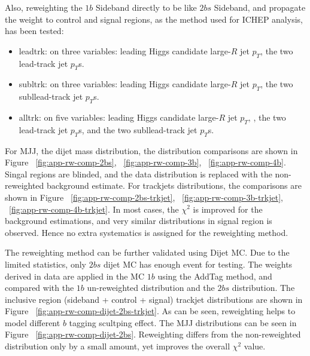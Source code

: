 Also, reweighting the $1b$ Sideband directly to be like $2bs$ Sideband, and propagate the weight to control and signal regions, as the method used for ICHEP analysis, has been tested:
\begin{itemize}
	\item leadtrk: on three variables: leading Higgs candidate large-$R$ jet $p_{T}$, the two lead-track jet $p_{T}$s.
	\item subltrk: on three variables: leading Higgs candidate large-$R$ jet $p_{T}$, the two subllead-track jet $p_{T}$s.
	\item alltrk: on five variables: leading Higgs candidate large-$R$ jet $p_{T}$, , the two lead-track jet $p_{T}$s, and the two subllead-track jet $p_{T}$s.
\end{itemize}

For MJJ, the dijet mass distribution, the distribution comparisons are shown in Figure ~\ref{fig:app-rw-comp-2bs}, ~\ref{fig:app-rw-comp-3b}, ~\ref{fig:app-rw-comp-4b}. Singal regions are blinded, and the data distribution is replaced with the non-reweighted background estimate. For trackjets \pt distributions, the comparisons are shown in Figure ~\ref{fig:app-rw-comp-2bs-trkjet}, ~\ref{fig:app-rw-comp-3b-trkjet}, ~\ref{fig:app-rw-comp-4b-trkjet}. In most cases, the $\chi^2$ is improved for the background estimations, and very similar distributions in signal region is observed. Hence no extra systematics is assigned for the reweighting method.

The reweighting method can be further validated using Dijet MC. Due to the limited statistics, only $2bs$ dijet MC has enough event for testing. The weights derived in data are applied in the MC $1b$ using the AddTag method, and compared with the $1b$ un-reweighted distribution and the $2bs$ distribution. The inclusive region (sideband + control + signal) trackjet \pt distributions are shown in Figure ~\ref{fig:app-rw-comp-dijet-2bs-trkjet}. As can be seen, reweighting helps to model different $b$ tagging scultping effect. The MJJ distributions can be seen in Figure ~\ref{fig:app-rw-comp-dijet-2bs}. Reweighting differs from the non-reweighted distribution only by a small amount, yet improves the overall $\chi^2$ value.

